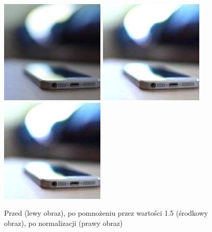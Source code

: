 \documentclass[a4paper,12pt]{book}
\begin{document}
\begin{figure}[H]
	\caption{Przed (lewy obraz), po pomnożeniu przez wartości 1.5 (środkowy obraz), po normalizacji (prawy obraz)}
	\includegraphics[width=5cm, height=5cm]{phone-unmodified.jpg}
	\includegraphics[width=5cm, height=5cm]{3-2/multiply-color-const-phone-15.png}
	\includegraphics[width=5cm, height=5cm]{3-2/multiply-color-const-phone-15-norm.png}
\end{figure}
\end{document}
